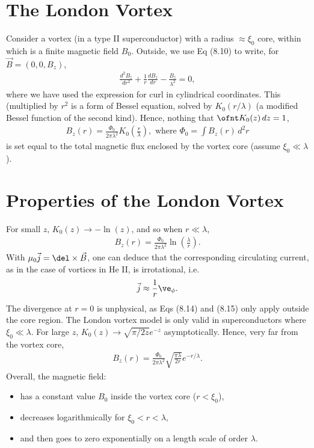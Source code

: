 \documentclass[a4paper, 11pt, normalem]{report}
\begin{document}
\section{The London Vortex}
Consider a vortex (in a type II superconductor) with a radius $\approx\xi_0$ core, within which is a finite magnetic field $B_0$.
Outside, we use Eq (8.10) to write, for $\vec{B}=(0,0,B_z)$,
\begin{align}
    \frac{d^2 B_z}{dr^2} + \frac{1}{r}\frac{dB_z}{dr} - \frac{B_z}{\lambda^2} = 0,
\end{align}
where we have used the expression for curl in cylindrical coordinates.
This (multiplied by $r^2$ is a form of Bessel equation, solved by $K_0(r/\lambda)$ (a modified Bessel function of the second kind).
Hence, nothing that $\ofnt K_0(z)\,dz = 1$,
\begin{align}
    B_z(r) = \frac{\Phi_0}{2\pi\lambda^2}K_0\left(\frac{r}{\lambda}\right), \text{ where } \Phi_0 = \int B_z(r)\,d^2r
\end{align}
is set equal to the total magnetic flux enclosed by the vortex core (assume $\xi_0\ll\lambda$).

\section{Properties of the London Vortex}
For small $z$, $K_0(z)\to-\ln(z)$, and so when $r\ll\lambda$,
\begin{align}
    B_z(r) = \frac{\Phi_0}{2\pi\lambda^2}\ln\left(\frac{\lambda}{r}\right).
\end{align}
With $\mu_0\vec{j}=\del\times\vec{B}$, one can deduce that the corresponding circulating current, as in the case of vortices in He II, is irrotational, i.e.
\begin{align}
    \vec{j} \approx \frac{1}{r}\ve_\phi.
\end{align}
The divergence at $r=0$ is unphysical, as Eqs (8.14) and (8.15) only apply outside the core region.
The London vortex model is only valid in superconductors where $\xi_0\ll\lambda$.
For large $z$, $K_0(z)\to\sqrt{\pi/2z}e^{-z}$ asymptotically.
Hence, very far from the vortex core,
\begin{align}
    B_z(r) = \frac{\Phi_0}{2\pi\lambda^2}\sqrt{\frac{\pi\lambda}{2r}}e^{-r/\lambda}.
\end{align}
Overall, the magnetic field:
\begin{itemize}
    \item has a constant value $B_0$ inside the vortex core ($r<\xi_0$),
    \item decreases logarithmically for $\xi_0<r<\lambda$,
    \item and then goes to zero exponentially on a length scale of order $\lambda$.
\end{itemize}
\end{document}
